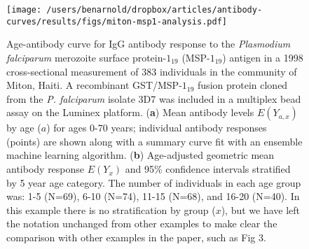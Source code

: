 \documentclass[11pt]{article}
\begin{document}
\clearpage
\begin{figure}[htbp]
\begin{center}
\texttt{[image: /users/benarnold/dropbox/articles/antibody-curves/results/figs/miton-msp1-analysis.pdf]}
\begin{minipage}{\textwidth}
\caption{Age-antibody curve for IgG antibody response to the \textit{Plasmodium falciparum} merozoite surface protein-$1_{19}$ (MSP-$1_{19}$) antigen in a 1998 cross-sectional measurement of 383 individuals in the community of Miton, Haiti. A recombinant GST/MSP-$1_{19}$ fusion protein cloned from the \textit{P. falciparum} isolate 3D7 was included in a multiplex bead assay on the Luminex platform. (\textbf{a}) Mean antibody levels $E(Y_{a,x})$ by age ($a$) for ages 0-70 years; individual antibody responses (points) are shown along with a summary curve fit with an ensemble machine learning algorithm. (\textbf{b}) Age-adjusted geometric mean antibody response $E(Y_{x})$ and 95\% confidence intervals stratified by 5 year age category. The number of individuals in each age group was: 1-5 (N=69), 6-10 (N=74), 11-15 (N=68), and 16-20 (N=40). In this example there is no stratification by group ($x$), but we have left the notation unchanged from other examples to make clear the comparison with other examples in the paper, such as Fig 3.}
\label{fig:mitonEYxa}
\end{minipage}
\end{center}
\end{figure}
\end{document}
